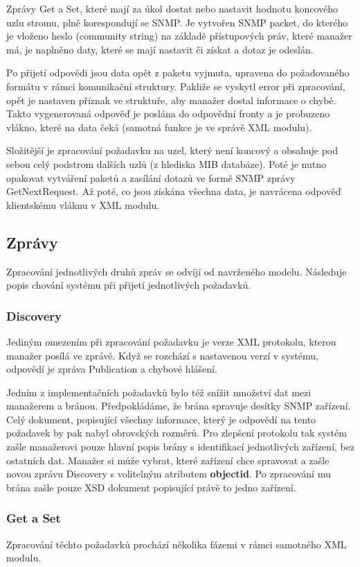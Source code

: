Zprávy Get a Set, které mají za úkol dostat nebo nastavit hodnotu koncového uzlu stromu, plně korespondují se SNMP. Je vytvořen SNMP packet, do kterého je vloženo
heslo (community string) na základě přístupových práv, které manažer má, je naplněno daty, které se mají nastavit či získat a dotaz je odeslán.

Po přijetí odpovědi jsou data opět z paketu vyjmuta, upravena do požadovaného formátu v rámci komunikační struktury. Pakliže se vyskytl error při zpracování, opět
je nastaven příznak ve struktuře, aby manažer dostal informace o chybě. Takto vygenerovaná odpověď je poslána do odpovědní fronty a je probuzeno vlákno, které na
data čeká (samotná funkce je ve správě XML modulu).

Složitější je zpracování požadavku na uzel, který není koncový a obsahuje pod sebou celý podstrom dalších uzlů (z hlediska MIB databáze). Poté je nutno opakovat
vytváření paketů a zasílání dotazů ve formě SNMP zprávy GetNextRequest. Až poté, co jsou získána všechna data, je navrácena odpověď klientskému vláknu v XML modulu.


\subsection{Zprávy}
Zpracování jednotlivých druhů zpráv se odvíjí od navrženého modelu. Následuje popis chování systému při přijetí jednotlivých požadavků.

\subsubsection*{Discovery}
Jediným omezením při zpracování požadavku je verze XML protokolu, kterou manažer posílá ve zprávě. Když se rozchází s nastavenou 
verzí v systému, odpovědí je zpráva Publication a chybové hlášení.

Jedním z implementačních požadavků bylo též snížit množství dat mezi manažerem a bránou. Předpokládáme, že brána spravuje
desítky SNMP zařízení. Celý dokument, popisující všechny informace, který je odpovědí na tento požadavek by pak nabyl
obrovských rozměrů. Pro zlepšení protokolu tak systém zašle manažerovi pouze hlavní popis brány s identifikací jednotlivých zařízení, bez ostatních dat.
Manažer si může vybrat, které zařízení chce spravovat a zašle novou zprávu Discovery s volitelným atributem \textbf{objectid}. Po zpracování
mu brána zašle pouze XSD dokument popisující právě to jedno zařízení.

\subsubsection*{Get a Set}
Zpracování těchto požadavků prochází několika fázemi v rámci samotného XML modulu.

